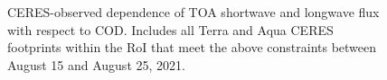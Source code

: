 \documentclass[12pt]{article}
\begin{document}
    \begin{figure}[h!]
        \centering
        \begin{center}
        \end{center}
        \caption{CERES-observed dependence of TOA shortwave and longwave flux with respect to COD. Includes all Terra and Aqua CERES footprints within the RoI that meet the above constraints between August 15 and August 25, 2021.}
        \label{ocod}
    \end{figure}
\end{document}
